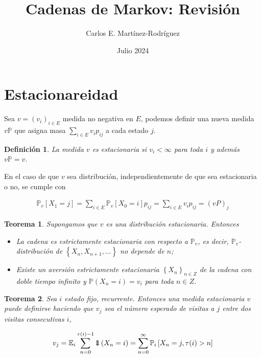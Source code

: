 \documentclass{article}
\title{Cadenas de Markov: Revisi\'on}
\author{Carlos E. Martínez-Rodríguez}
\date{Julio 2024}
\newtheorem{Def}{Definición}
\newtheorem{Teo}{Teorema}
\newcommand{\esp}{\mathbb{E}}
\newcommand{\prob}{\mathbb{P}}
\newcommand{\indora}{\mbox{$1$\hspace{-0.8ex}$1$}}
\begin{document}
\maketitle

\tableofcontents


%
\section{Estacionareidad}

Sea $v=\left(v_{i}\right)_{i\in E}$ medida no negativa en $E$, podemos definir una nueva medida $v\prob$ que asigna masa $\sum_{i\in E}v_{i}p_{ij}$ a cada estado $j$.

\begin{Def}
La medida $v$ es estacionaria si $v_{i}<\infty$ para toda $i$ y adem\'as $v\prob=v$.
\end{Def}
En el caso de que $v$ sea distribuci\'on, independientemente de que sea estacionaria o no, se cumple con

\begin{eqnarray*}
\prob_{v}\left[X_{1}=j\right]=\sum_{i\in E}\prob_{v}\left[X_{0}=i\right]p_{ij}=\sum_{i\in E}v_{i}p_{ij}=\left(vP\right)_{j}
\end{eqnarray*}

\begin{Teo}
Supongamos que $v$ es una distribuci\'on estacionaria. Entonces
\begin{itemize}
\item[i)] La cadena es estrictamente estacionaria con respecto a
$\prob_{v}$, es decir, $\prob_{v}$-distribuci\'on de $\left\{X_{n},X_{n+1},\ldots\right\}$ no depende de $n$;
\item[ii)] Existe un aversi\'on estrictamente estacionaria $\left\{X_{n}\right\}_{n\in Z}$ de la cadena con doble tiempo infinito y $\prob\left(X_{n}=i\right)=v_{i}$ para toda $n\in Z$.
\end{itemize}
\end{Teo}

\begin{Teo}
Sea $i$ estado fijo, recurrente. Entonces una medida estacionaria $v$ puede definirse haciendo que $v_{j}$ sea el n\'umero esperado de visitas a $j$ entre dos visitas consecutivas $i$,

\begin{equation}\label{Eq.3.1}
v_{j}=\esp_{i}\sum_{n=0}^{\tau(i)-1}\indora\left(X_{n}=i\right)=\sum_{n=0}^{\infty}\prob_{i}\left[X_{n}=j,\tau(i)>n\right]
\end{equation}
\end{Teo}
\end{document}
